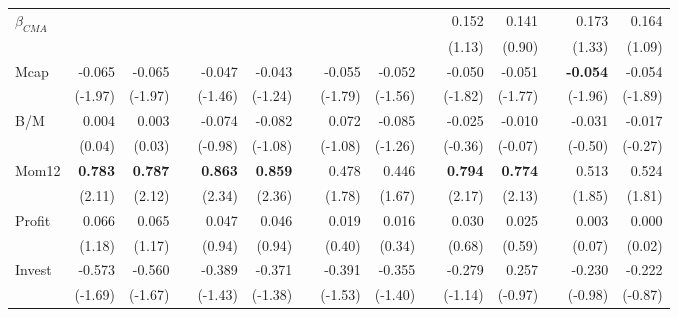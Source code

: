 \begin{singlespacing}
\begin{table}[H]
\begin{tabular}{lrrrrrrrrrrrrrr}
$\beta_{CMA}$  &                &                &           &                &                &           &                &                &  & 0.152          & 0.141          &  & 0.173           & 0.164          \\
      &                &                &           &                &                &           &                &                &  & (1.13)         & (0.90)         &  & (1.33)          & (1.09)         \\
Mcap  & -0.065         & -0.065         &           & -0.047         & -0.043         &           & -0.055         & -0.052         &  & -0.050         & -0.051         &  & \textbf{-0.054} & -0.054         \\
      & (-1.97)        & (-1.97)        &           & (-1.46)        & (-1.24)        &           & (-1.79)        & (-1.56)        &  & (-1.82)        & (-1.77)        &  & (-1.96)         & (-1.89)        \\
B/M   & 0.004          & 0.003          &           & -0.074         & -0.082         &           & 0.072          & -0.085         &  & -0.025         & -0.010         &  & -0.031          & -0.017         \\
      & (0.04)         & (0.03)         &           & (-0.98)        & (-1.08)        &           & (-1.08)        & (-1.26)        &  & (-0.36)        & (-0.07)        &  & (-0.50)         & (-0.27)        \\
Mom12 & \textbf{0.783} & \textbf{0.787} & \textbf{} & \textbf{0.863} & \textbf{0.859} &           & 0.478          & 0.446          &  & \textbf{0.794} & \textbf{0.774} &  & 0.513           & 0.524          \\
      & (2.11)         & (2.12)         &           & (2.34)         & (2.36)         &           & (1.78)         & (1.67)         &  & (2.17)         & (2.13)         &  & (1.85)          & (1.81)         \\
Profit    & 0.066          & 0.065          &           & 0.047          & 0.046          &           & 0.019          & 0.016          &  & 0.030          & 0.025          &  & 0.003           & 0.000          \\
      & (1.18)         & (1.17)         &           & (0.94)         & (0.94)         &           & (0.40)         & (0.34)         &  & (0.68)         & (0.59)         &  & (0.07)          & (0.02)         \\
Invest  & -0.573         & -0.560         &           & -0.389         & -0.371         &           & -0.391         & -0.355         &  & -0.279         & 0.257          &  & -0.230          & -0.222         \\
      & (-1.69)        & (-1.67)        &           & (-1.43)        & (-1.38)        &           & (-1.53)        & (-1.40)        &  & (-1.14)        & (-0.97)        &  & (-0.98)         & (-0.87)         \\ \hline
\end{tabular}
\end{table}
\end{singlespacing}


